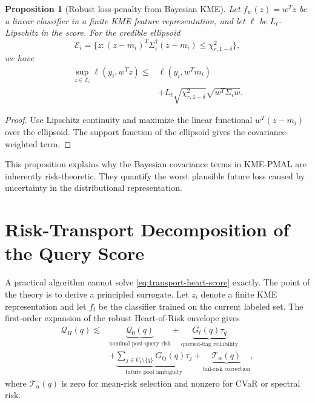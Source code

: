 \documentclass[10pt,journal]{IEEEtran}
\newtheorem{proposition}{Proposition}
\newcommand{\Qcal}{\mathcal{Q}}
\newcommand{\Tcal}{\mathcal{T}}
\newcommand{\Ecal}{\mathcal{E}}
\begin{document}
\begin{proposition}[Robust loss penalty from Bayesian KME]
\label{prop:bayesian-penalty-v5}
Let $f_w(z)=w^Tz$ be a linear classifier in a finite KME feature representation, and let $\ell$ be $L_\ell$-Lipschitz in the score. For the credible ellipsoid
\begin{equation}
    \Ecal_i=\{z:(z-m_i)^T\Sigma_i^\dagger(z-m_i)\le \chi^2_{r,1-\delta}\},
\end{equation}
we have
\begin{equation}
\begin{aligned}
\sup_{z\in\Ecal_i}\ell(y_i,w^Tz)
\le{}& \ell(y_i,w^Tm_i)\\
&+L_\ell\sqrt{\chi^2_{r,1-\delta}}\sqrt{w^T\Sigma_iw}.
\end{aligned}
\end{equation}
\end{proposition}

\begin{proof}
Use Lipschitz continuity and maximize the linear functional $w^T(z-m_i)$ over the ellipsoid. The support function of the ellipsoid gives the covariance-weighted term.
\end{proof}

This proposition explains why the Bayesian covariance terms in KME-PMAL are inherently risk-theoretic. They quantify the worst plausible future loss caused by uncertainty in the distributional representation.

\section{Risk-Transport Decomposition of the Query Score}
\label{sec:risk-transport-score}

A practical algorithm cannot solve \eqref{eq:transport-heart-score} exactly. The point of the theory is to derive a principled surrogate. Let $z_i$ denote a finite KME representation and let $f_t$ be the classifier trained on the current labeled set. The first-order expansion of the robust Heart-of-Risk envelope gives
\begin{equation}
\label{eq:first-order-heart-envelope-v5}
\begin{aligned}
\Qcal_H(q)
\lesssim{}& \underbrace{\Qcal_0(q)}_{\text{nominal post-query risk}}
+\underbrace{G_t(q)\tau_q}_{\text{queried-bag reliability}}\\
&+\underbrace{\sum_{j\in U_t\setminus\{q\}}G_{tj}(q)\tau_j}_{\text{future pool ambiguity}}
+\underbrace{\Tcal_\alpha(q)}_{\text{tail-risk correction}},
\end{aligned}
\end{equation}
where $\Tcal_\alpha(q)$ is zero for mean-risk selection and nonzero for CVaR or spectral risk.
\end{document}
